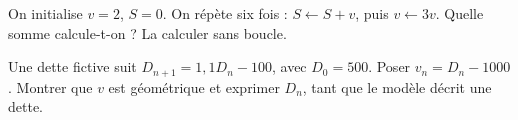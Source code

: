 \documentclass[11pt,a4paper]{article}
\begin{document}
\par\noindent\begin{minipage}{\linewidth}
On initialise $v=2$, $S=0$. On répète six fois : $S\leftarrow S+v$, puis $v\leftarrow3v$. Quelle somme calcule-t-on ? La calculer sans boucle.
\end{minipage}\par
\par\noindent\begin{minipage}{\linewidth}
Une dette fictive suit $D_{n+1}=1,1D_n-100$, avec $D_0=500$. Poser $v_n=D_n-1000$. Montrer que $v$ est géométrique et exprimer $D_n$, tant que le modèle décrit une dette.
\end{minipage}\par
\end{document}
